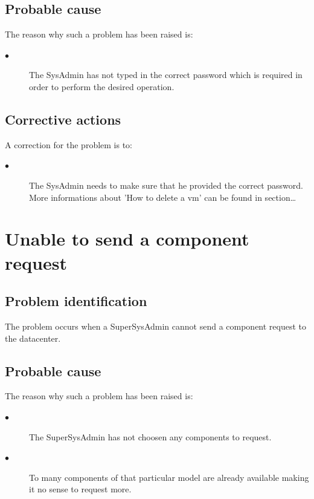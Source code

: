 \subsection{Probable cause}

The reason why such a problem has been raised is:\\
\begin{description}
\item[$\bullet$] The SysAdmin has not typed in the correct password which is
required in order to perform the desired operation.
\end{description}


\subsection{Corrective actions}

A correction for the problem is to:\\
\begin{description}
\item[$\bullet$] The SysAdmin needs to make sure that he provided the correct
password. More informations about 'How to delete a vm' can be found in
section\ldots

\end{description}






\section{Unable to send a component request}

\subsection{Problem identification}
The problem occurs when a SuperSysAdmin cannot send a component request to the
datacenter.

\subsection{Probable cause}

The reason why such a problem has been raised is:\\
\begin{description}
\item[$\bullet$] The SuperSysAdmin has not choosen any components to request.
\item[$\bullet$] To many components of that particular model are already
available making it no sense to request more.
\end{description}


